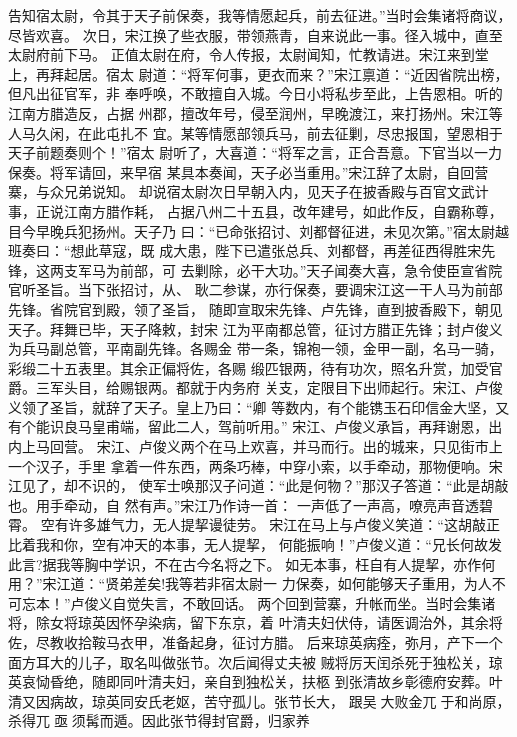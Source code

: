 告知宿太尉，令其于天子前保奏，我等情愿起兵，前去征进。”当时会集诸将商议，
尽皆欢喜。
次日，宋江换了些衣服，带领燕青，自来说此一事。径入城中，直至太尉府前下马。
正值太尉在府，令人传报，太尉闻知，忙教请进。宋江来到堂上，再拜起居。宿太
尉道：“将军何事，更衣而来？”宋江禀道：“近因省院出榜，但凡出征官军，非
奉呼唤，不敢擅自入城。今日小将私步至此，上告恩相。听的江南方腊造反，占据
州郡，擅改年号，侵至润州，早晚渡江，来打扬州。宋江等人马久闲，在此屯扎不
宜。某等情愿部领兵马，前去征剿，尽忠报国，望恩相于天子前题奏则个！”宿太
尉听了，大喜道：“将军之言，正合吾意。下官当以一力保奏。将军请回，来早宿
某具本奏闻，天子必当重用。”宋江辞了太尉，自回营寨，与众兄弟说知。
却说宿太尉次日早朝入内，见天子在披香殿与百官文武计事，正说江南方腊作耗，
占据八州二十五县，改年建号，如此作反，自霸称尊，目今早晚兵犯扬州。天子乃
曰：“已命张招讨、刘都督征进，未见次第。”宿太尉越班奏曰：“想此草寇，既
成大患，陛下已遣张总兵、刘都督，再差征西得胜宋先锋，这两支军马为前部，可
去剿除，必干大功。”天子闻奏大喜，急令使臣宣省院官听圣旨。当下张招讨，从、
耿二参谋，亦行保奏，要调宋江这一干人马为前部先锋。省院官到殿，领了圣旨，
随即宣取宋先锋、卢先锋，直到披香殿下，朝见天子。拜舞已毕，天子降敕，封宋
江为平南都总管，征讨方腊正先锋；封卢俊义为兵马副总管，平南副先锋。各赐金
带一条，锦袍一领，金甲一副，名马一骑，彩缎二十五表里。其余正偏将佐，各赐
缎匹银两，待有功次，照名升赏，加受官爵。三军头目，给赐银两。都就于内务府
关支，定限目下出师起行。宋江、卢俊义领了圣旨，就辞了天子。皇上乃曰：“卿
等数内，有个能镌玉石印信金大坚，又有个能识良马皇甫端，留此二人，驾前听用。”
宋江、卢俊义承旨，再拜谢恩，出内上马回营。
宋江、卢俊义两个在马上欢喜，并马而行。出的城来，只见街市上一个汉子，手里
拿着一件东西，两条巧棒，中穿小索，以手牵动，那物便响。宋江见了，却不识的，
使军士唤那汉子问道：“此是何物？”那汉子答道：“此是胡敲也。用手牵动，自
然有声。”宋江乃作诗一首：
一声低了一声高，嘹亮声音透碧霄。
空有许多雄气力，无人提挈谩徒劳。
宋江在马上与卢俊义笑道：“这胡敲正比着我和你，空有冲天的本事，无人提挈，
何能振响！”卢俊义道：“兄长何故发此言?据我等胸中学识，不在古今名将之下。
如无本事，枉自有人提挈，亦作何用？”宋江道：“贤弟差矣!我等若非宿太尉一
力保奏，如何能够天子重用，为人不可忘本！”卢俊义自觉失言，不敢回话。
两个回到营寨，升帐而坐。当时会集诸将，除女将琼英因怀孕染病，留下东京，着
叶清夫妇伏侍，请医调治外，其余将佐，尽教收拾鞍马衣甲，准备起身，征讨方腊。
后来琼英病痊，弥月，产下一个面方耳大的儿子，取名叫做张节。次后闻得丈夫被
贼将厉天闰杀死于独松关，琼英哀恸昏绝，随即同叶清夫妇，亲自到独松关，扶柩
到张清故乡彰德府安葬。叶清又因病故，琼英同安氏老妪，苦守孤儿。张节长大，
跟吴大败金兀于和尚原，杀得兀亟须髯而遁。因此张节得封官爵，归家养
